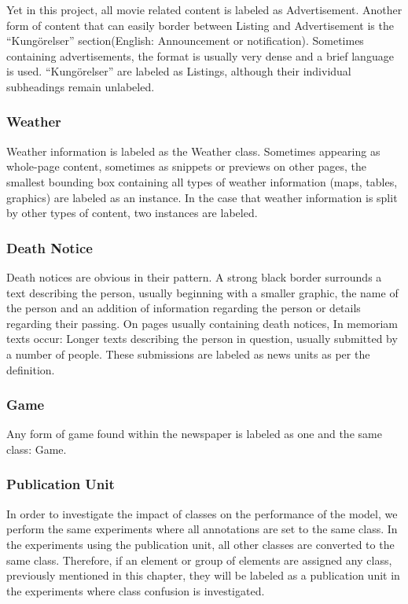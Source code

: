 \documentclass[english, bibtex]{kththesis}
\begin{document}
Yet in this project, all movie related content is labeled as Advertisement. Another form of content that can easily border between Listing and Advertisement is the “Kungörelser” section(English: Announcement or notification). Sometimes containing advertisements, the format is usually very dense and a brief language is used. “Kungörelser” are labeled as Listings, although their individual subheadings remain unlabeled.

\subsubsection{Weather}

Weather information is labeled as the Weather class. Sometimes appearing as whole-page content, sometimes as snippets or previews on other pages, the smallest bounding box containing all types of weather information (maps, tables, graphics) are labeled as an instance. In the case that weather information is split by other types of content, two instances are labeled.

\subsubsection{Death Notice}

Death notices are obvious in their pattern. A strong black border surrounds a text describing the person, usually beginning with a smaller graphic, the name of the person and an addition of information regarding the person or details regarding their passing. On pages usually containing death notices, In memoriam texts occur: Longer texts describing the person in question, usually submitted by a number of people. These submissions are labeled as news units as per the definition. 

\subsubsection{Game}

Any form of game found within the newspaper is labeled as one and the same class: Game.  

\subsubsection{Publication Unit}

In order to investigate the impact of classes on the performance of the model, we perform the same experiments where all annotations are set to the same class. In the experiments using the publication unit, all other classes are converted to the same class. Therefore, if an element or group of elements are assigned any class, previously mentioned in this chapter, they will be labeled as a publication unit in the experiments where class confusion is investigated.
\end{document}
